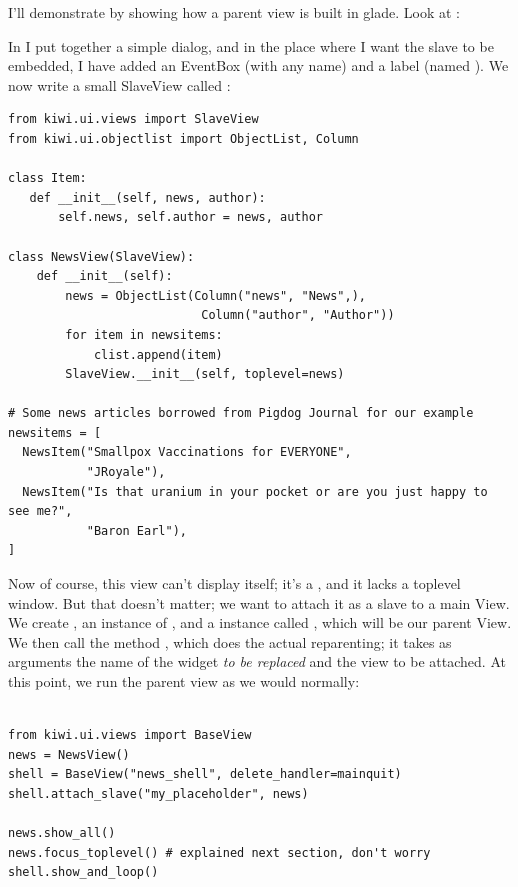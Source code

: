 \documentclass[a4paper]{howto}
\begin{document}
I'll demonstrate by showing how a parent view is built in glade. Look at
:


In  I put together a simple dialog, and in the place where
I want the slave to be embedded, I have added an EventBox (with any
name) and a label (named ). We now write a
small SlaveView called :

\begin{verbatim}
from kiwi.ui.views import SlaveView
from kiwi.ui.objectlist import ObjectList, Column

class Item:
   def __init__(self, news, author):
       self.news, self.author = news, author

class NewsView(SlaveView):
    def __init__(self):
        news = ObjectList(Column("news", "News",),
                           Column("author", "Author"))
        for item in newsitems:
            clist.append(item)
        SlaveView.__init__(self, toplevel=news)

# Some news articles borrowed from Pigdog Journal for our example
newsitems = [
  NewsItem("Smallpox Vaccinations for EVERYONE",
           "JRoyale"),
  NewsItem("Is that uranium in your pocket or are you just happy to see me?",
           "Baron Earl"),
]

\end{verbatim}

Now of course, this view can't display itself; it's a ,
and it lacks a toplevel window. But that doesn't matter; we want to
attach it as a slave to a main View. We create , an instance
of , and a  instance called
, which will be our parent View. We then call the method
, which does the actual reparenting; it takes as
arguments the name of the widget {\it to be replaced} and the view to be
attached. At this point, we run the parent view as we would normally:

\begin{verbatim}

from kiwi.ui.views import BaseView
news = NewsView()
shell = BaseView("news_shell", delete_handler=mainquit)
shell.attach_slave("my_placeholder", news)

news.show_all()
news.focus_toplevel() # explained next section, don't worry
shell.show_and_loop()
\end{verbatim}
\end{document}
